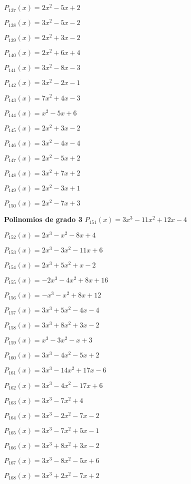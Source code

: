 \subitem $P_{137}(x) = 2x^2 - 5x + 2$

\subitem $P_{138}(x) = 3x^2 - 5x - 2$

\subitem $P_{139}(x) = 2x^2 + 3x - 2$

\subitem $P_{140}(x) = 2x^2 + 6x + 4$

\subitem $P_{141}(x) = 3x^2 - 8x - 3$

\subitem $P_{142}(x) = 3x^2 - 2x - 1$

\subitem $P_{143}(x) = 7x^2 + 4x - 3$

\subitem $P_{144}(x) = x^2 - 5x + 6$

\subitem $P_{145}(x) = 2x^2 + 3x - 2$

\subitem $P_{146}(x) = 3x^2 - 4x - 4$

\subitem $P_{147}(x) = 2x^2 - 5x + 2$

\subitem $P_{148}(x) = 3x^2 + 7x + 2$

\subitem $P_{149}(x) = 2x^2 - 3x + 1$

\subitem $P_{150}(x) = 2x^2 - 7x + 3$

\textbf{Polinomios de grado 3} 
\subitem $P_{151}(x) = 3x^3 - 11x^2 + 12x - 4$

\subitem $P_{152}(x) = 2x^3 - x^2 - 8x + 4$

\subitem $P_{153}(x) = 2x^3 - 3x^2 - 11x + 6$

\subitem $P_{154}(x) = 2x^3 + 5x^2 + x - 2$

\subitem $P_{155}(x) = -2x^3 - 4x^2 + 8x + 16$

\subitem $P_{156}(x) = -x^3 - x^2 + 8x + 12$

\subitem $P_{157}(x) = 3x^3 + 5x^2 - 4x - 4$

\subitem $P_{158}(x) = 3x^3 + 8x^2 + 3x - 2$

\subitem $P_{159}(x) = x^3 - 3x^2 - x + 3$

\subitem $P_{160}(x) = 3x^3 - 4x^2 - 5x + 2$

\subitem $P_{161}(x) = 3x^3 - 14x^2 + 17x - 6$

\subitem $P_{162}(x) = 3x^3 - 4x^2 - 17x + 6$

\subitem $P_{163}(x) = 3x^3 - 7x^2 + 4$

\subitem $P_{164}(x) = 3x^3 - 2x^2 - 7x - 2$

\subitem $P_{165}(x) = 3x^3 - 7x^2 + 5x - 1$

\subitem $P_{166}(x) = 3x^3 + 8x^2 + 3x - 2$

\subitem $P_{167}(x) = 3x^3 - 8x^2 - 5x + 6$

\subitem $P_{168}(x) = 3x^3 + 2x^2 - 7x + 2$

